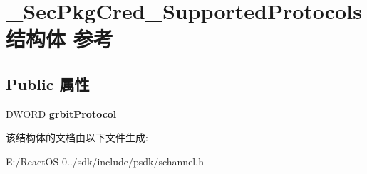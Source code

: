\hypertarget{struct___sec_pkg_cred___supported_protocols}{}\section{\+\_\+\+Sec\+Pkg\+Cred\+\_\+\+Supported\+Protocols结构体 参考}
\label{struct___sec_pkg_cred___supported_protocols}
\subsection*{Public 属性}
\begin{DoxyCompactItemize}
\item 
\mbox{\label{struct___sec_pkg_cred___supported_protocols_affabab5bf1d22b3dcd6086ba1b29f757}} 
D\+W\+O\+RD {\bfseries grbit\+Protocol}
\end{DoxyCompactItemize}


该结构体的文档由以下文件生成\+:\begin{DoxyCompactItemize}
\item 
E\+:/\+React\+O\+S-\/0../sdk/include/psdk/schannel.\+h\end{DoxyCompactItemize}
